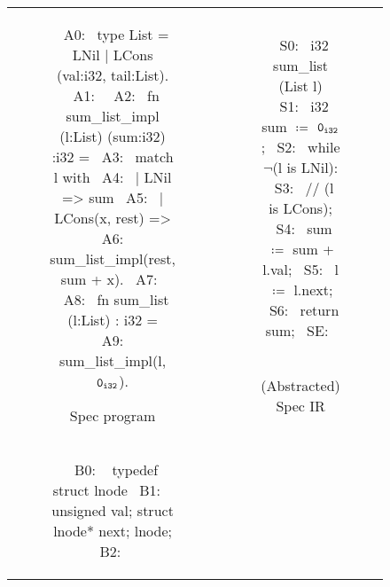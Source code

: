 \begin{figure}[t!]
\begin{tabular}{@{}c@{}c@{}}
\begin{subfigure}[b]{0.63\textwidth}
\begin{center}
\begin{allLangEnvFoot}
~{\scriptsize \textcolor{mygray}{A0:}}~ type List = LNil | LCons (val:i32, tail:List).
~{\scriptsize \textcolor{mygray}{A1:}}~
~{\scriptsize \textcolor{mygray}{A2:}}~ fn sum_list_impl (l:List) (sum:i32) :i32 =
~{\scriptsize \textcolor{mygray}{A3:}}~    match l with
~{\scriptsize \textcolor{mygray}{A4:}}~    | LNil => sum
~{\scriptsize \textcolor{mygray}{A5:}}~    | LCons(x, rest) =>
~{\scriptsize \textcolor{mygray}{A6:}}~                sum_list_impl(rest, sum + x).
~{\scriptsize \textcolor{mygray}{A7:}}~
~{\scriptsize \textcolor{mygray}{A8:}}~ fn sum_list (l:List) : i32 =
~{\scriptsize \textcolor{mygray}{A9:}}~    sum_list_impl(l, ${\tt 0_{i32}}$).
\end{allLangEnvFoot}
\end{center}
\caption{\label{fig:llTraverseSpec}Spec program}
\end{subfigure}%
&
\begin{subfigure}[b]{0.37\textwidth}
\begin{center}
\begin{allLangEnvFoot}
~{\scriptsize \textcolor{mygray}{S0:}}~ i32 sum_list (List l) {
~{\scriptsize \textcolor{mygray}{S1:}}~   i32 sum $\coloneqq$ ${\tt 0_{i32}}$;
~{\scriptsize \textcolor{mygray}{S2:}}~   while $\neg$(l is LNil):
~{\scriptsize \textcolor{mygray}{S3:}}~     // (l is LCons);
~{\scriptsize \textcolor{mygray}{S4:}}~     sum $\coloneqq$ sum + l.val;
~{\scriptsize \textcolor{mygray}{S5:}}~     l   $\coloneqq$ l.next;
~{\scriptsize \textcolor{mygray}{S6:}}~   return sum;
~{\scriptsize \textcolor{mygray}{SE:}}~ }
~{\scriptsize \textcolor{mygray}{}}~
~{\scriptsize \textcolor{mygray}{}}~
\end{allLangEnvFoot}
\end{center}
\caption{\label{fig:llTraverseSpecIR}(Abstracted) Spec IR}
\end{subfigure}%
\\
\begin{subfigure}[b]{0.63\textwidth}
\begin{center}
\begin{allLangEnvFoot}
~{\scriptsize \textcolor{mygray}{B0: }}~ typedef struct lnode {
~{\scriptsize \textcolor{mygray}{B1: }}~   unsigned val; struct lnode* next; } lnode;
~{\scriptsize \textcolor{mygray}{B2: }}~ 

\end{allLangEnvFoot}
\end{center}
\end{subfigure}
\end{tabular}
\end{figure}

